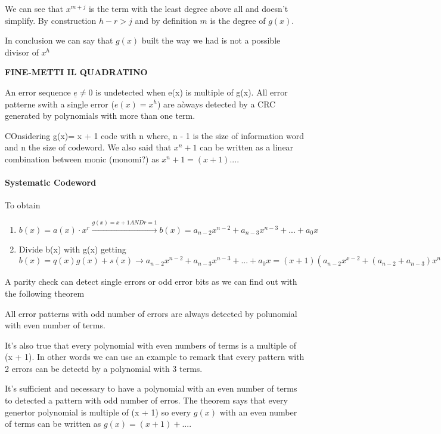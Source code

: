 We can see that $x^{m+j}$ is the term with the least degree above all and doesn't simplify. By construction $h - r > j$ and by definition $m$ is the degree of $g(x)$.

In conclusion we can say that $g(x)$ built the way we had is not a possible divisor of $x^h$

\textbf{FINE-METTI IL QUADRATINO}

An error sequence $\underline{e}\neq 0$ is undetected when e(x) is multiple of g(x).
All error patterne swith a single error ($e(x) = x^h$) are aòways detected by a CRC generated by polynomials with more than one term. 


COnsidering g(x)= x + 1 code with n where, n - 1 is the size of information word and n the size of codeword. We also said that $x^n + 1 $ can be written as a linear combination between monic (monomi?) as $x^n + 1 = (x+1)...$.

\paragraph{Systematic Codeword}
To obtain 
\begin{enumerate}
\item $b(x) = a(x)\cdot x^r \stackrel{g(x) = x + 1 	AND r = 1}{\rightarrow} b(x) = a_{n-2}x^{n-2} + a_{n-3}x^{n-3}+...+a_0x$
\item Divide b(x) with g(x) getting $b(x) = q(x)g(x) + s(x) \rightarrow a_{n-2}x^{n-2} + a_{n-3}x^{n-3}+...+a_0x = (x + 1)(a_{n-2}x^{x-2} + (a_{n-2} + a_{n-3})x^{n-3}) + (a_{n-2}+a_{n-3}+a_{n-4}+..a_0)$
\end{enumerate}

A parity check can detect single errors or odd error bits as we can find out with the following theorem
\begin{theorem}
All error patterns with odd number of errors are always detected by polunomial with even number of terms.
\end{theorem}

It's also true that every polynomial with even numbers of terms is a multiple of (x + 1). 
In other words we can use an example to remark that every pattern with 2 errors can be detectd by a polynomial with 3 terms. 

It's sufficient and necessary to have a polynomial with an even number of terms to detected a pattern with odd number of erros. The theorem says that every genertor polynomial is multiple of (x + 1) so every $g(x)$ with an even number of terms can be written as $g(x) = (x+1)+...$.

